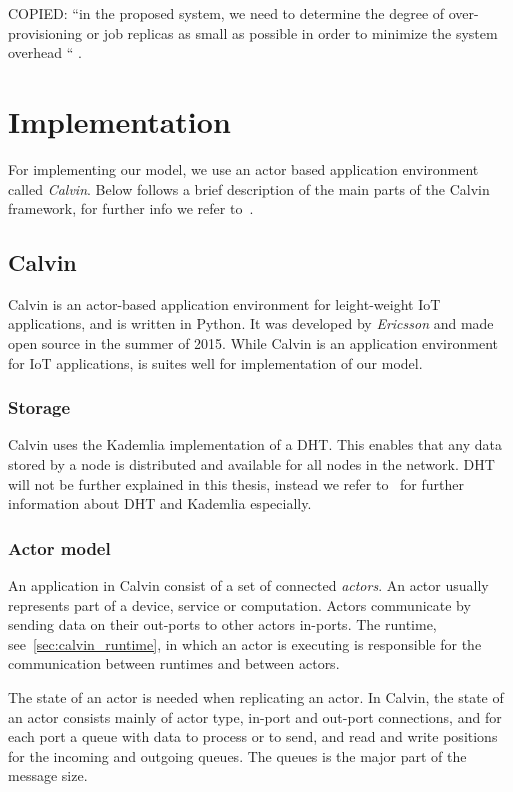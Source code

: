 \documentclass{cslthse-msc}
\begin{document}
COPIED: “in the proposed system, we need to determine the degree of over-provisioning or job replicas as small as possible in order to minimize the system overhead “ \cite{designFaultTolerantSched}.
\fi

\section{Implementation} \label{sec:design_implementation}
For implementing our model, we use an actor based application environment called \emph{Calvin}. Below follows a brief description of the main parts of the Calvin framework, for further info we refer to~\cite{calvin}.

\subsection{Calvin} \label{subsec:design_calvin}
Calvin is an actor-based application environment for leight-weight IoT applications, and is written in Python. It was developed by \emph{Ericsson} and made open source in the summer of 2015. While Calvin is an application environment for IoT applications, is suites well for implementation of our model.

\subsubsection{Storage} \label{sec:calvin_storage}
Calvin uses the Kademlia implementation of a DHT. This enables that any data stored by a node is distributed and available for all nodes in the network. DHT will not be further explained in this thesis, instead we refer to~\cite{kademlia} for further information about DHT and Kademlia especially.

\subsubsection{Actor model}
An application in Calvin consist of a set of connected \emph{actors}. An actor usually represents part of a device, service or computation. Actors communicate by sending data on their out-ports to other actors in-ports. The runtime, see~\cref{sec:calvin_runtime}, in which an actor is executing is responsible for the communication between runtimes and between actors.


The state of an actor is needed when replicating an actor. In Calvin, the state of an actor consists mainly of actor type, in-port and out-port connections, and for each port a queue with data to process or to send, and read and write positions for the incoming and outgoing queues. The queues is the major part of the message size.
\end{document}
